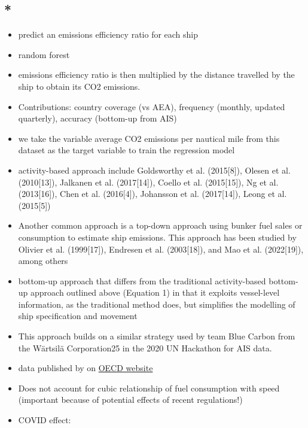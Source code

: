\documentclass{article}
\newcommand{\paperpath}{../resources/}
\newcommand{\myhref}[2]{\href{run:\paperpath#1}{#2}}
\begin{document}
\subsection{*\myhref{OECD 2023 - CO2 emissions from global shipping An new experimental database.pdf}{\textcite{clarke2023co2}}}
\begin{itemize}
    \item predict an emissions efficiency ratio for each ship 
    \item random forest 
    \item emissions efficiency ratio is then multiplied by the distance
    travelled by the ship to obtain its CO2 emissions.
    \item Contributions: country coverage (vs AEA), frequency (monthly, updated quarterly), accuracy (bottom-up from AIS)
    \item we take the variable average CO2 emissions per nautical mile from this dataset as the target variable to train the regression model
    \item activity-based approach include Goldsworthy et al. (2015[8]), Olesen et al. (2010[13]), Jalkanen et al. (2017[14]), Coello et
    al. (2015[15]), Ng et al. (2013[16]), Chen et al. (2016[4]), Johansson et al. (2017[14]), Leong et al. (2015[5])
    \item Another common approach is a top-down approach using bunker fuel sales or consumption to estimate
    ship emissions. This approach has been studied by Olivier et al. (1999[17]), Endresen et al. (2003[18]), and Mao et al. (2022[19]), among others
    \item bottom-up approach that differs from the traditional activity-based bottom-up
    approach outlined above (Equation 1) in that it exploits vessel-level information, as the traditional method does, but simplifies the modelling of ship specification and movement
    \item This approach builds on a similar strategy used by team Blue Carbon from the Wärtsilä Corporation25 in the 2020 UN Hackathon for AIS data.
    \item data published by on \href{https://stats.oecd.org/Index.aspx?DataSetCode=MTE}{OECD website}
    \item Does not account for cubic relationship of fuel consumption with speed (important because of potential effects of recent regulations!)
    \item COVID effect:
    \begin{center}

\end{center}
\end{itemize}
\end{document}
